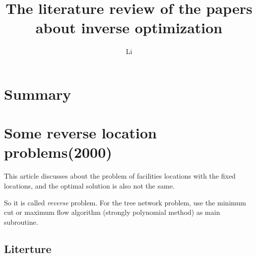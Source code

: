\documentclass[UTF8]{article}
\title{The literature review of the papers about inverse optimization}
\author{Li}
\begin{document}
\maketitle{}

\section{Summary}


\section{Some reverse location problems(2000)}

This article discusses about the problem of facilities locations with the fixed locations, and the optimal solution is also not the same.

So it is called \emph{reverse} problem. For the tree network problem, use the minimum cut or maximum flow algorithm (strongly polynomial method) as main subroutine.

\subsection{Literture}
\end{document}
